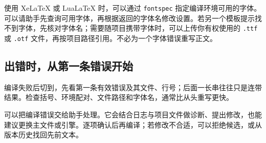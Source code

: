 使用 XeLaTeX 或 LuaLaTeX 时，可以通过 \texttt{fontspec} 指定编译环境可用的字体。可以请助手先查询可用字体，再根据返回的字体名修改设置。若另一个模板提示找不到字体，先核对字体名；需要随项目携带字体时，可以上传你有权使用的 \texttt{.ttf} 或 \texttt{.otf} 文件，再按项目路径引用。不必为一个字体错误重写正文。

\subsection{出错时，从第一条错误开始}
编译失败后切到，先看第一条有效错误及其文件、行号；后面一长串往往只是连带结果。检查括号、环境配对、文件路径和字体名，通常比从头重写更快。

可以把编译错误交给助手处理。它会结合日志与项目文件做诊断、提出修改，也能建议更换主文件或引擎。逐项确认后再编译；若修改不合适，可以拒绝候选，或从版本历史找回先前文本。

